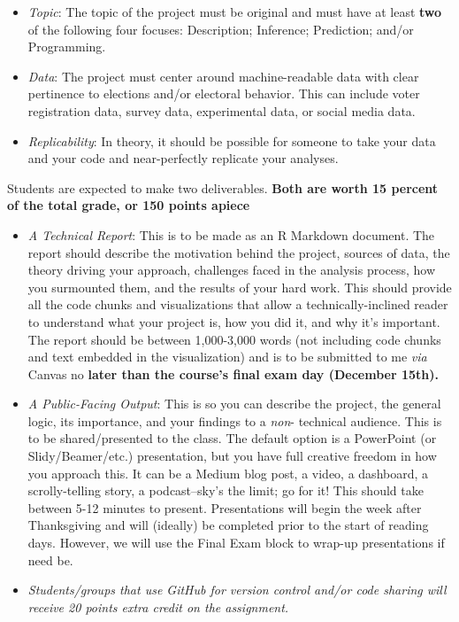 \documentclass[11pt]{article}
\begin{document}
\begin{itemize}
\begin{itemize}
\item \textit{Topic}: The topic of the project must be original and must have at least \textbf{two} of the following four focuses: Description; Inference; Prediction; and/or Programming.
\item \textit{Data}: The project must center around machine-readable data with clear pertinence to elections and/or electoral behavior. This can include voter registration data, survey data, experimental data, or social media data. 
\item \textit{Replicability}: In theory, it should be possible for someone to take your data and your code and near-perfectly replicate your analyses.   
\end{itemize}

Students are expected to make two deliverables. \textbf{Both are worth 15 percent of the total grade, or 150 points apiece} 

\begin{itemize}
\item \textit{A Technical Report}: This is to be made as an R Markdown document. The report should describe the motivation behind the project, sources of data, the theory driving your approach, challenges faced in the analysis process, how you surmounted them, and the results of your hard work. This should provide all the code chunks and visualizations that allow a technically-inclined reader to understand what your project is, how you did it, and why it's important. The report should be between 1,000-3,000 words (not including code chunks and text embedded in the visualization) and is to be submitted to me \textit{via} Canvas no \textbf{later than the course's final exam day (December 15th).}
\item \textit{A Public-Facing Output}: This is so you can describe the project, the general logic, its importance, and your findings to a \textit{non}- technical audience. This is to be shared/presented to the class. The default option is a PowerPoint (or Slidy/Beamer/etc.) presentation, but you have full creative freedom in how you approach this. It can be a Medium blog post, a video, a dashboard, a scrolly-telling story, a podcast--sky's the limit; go for it! This should take between 5-12 minutes to present. Presentations will begin the week after Thanksgiving and will (ideally) be completed prior to the start of reading days. However, we will use the Final Exam block to wrap-up presentations if need be.
\item \textit{Students/groups that use GitHub for version control and/or code sharing will receive 20 points extra credit on the assignment.}
\end{itemize} 


\end{itemize}
\end{document}
